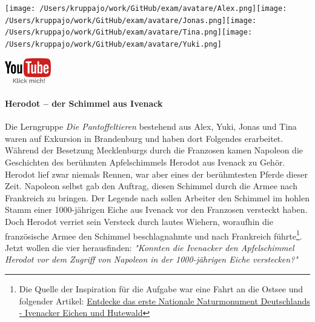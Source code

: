 \documentclass[a4paper, 9pt]{scrartcl}\usepackage[]{graphicx}\usepackage[]{xcolor}
\begin{document}
 
\ifcollection
\begin{flushright}
\tiny\vspace{-3Ex}
\textbf{\examinhaltstart}
\exammodulemathstat
\vspace{-4Ex}
\end{flushright}
\begin{minipage}[t]{0.5\textwidth}
\texttt{[image: /Users/kruppajo/work/GitHub/exam/avatare/Alex.png]}\hspace{-4mm}\texttt{[image: /Users/kruppajo/work/GitHub/exam/avatare/Jonas.png]}\hspace{-4mm}\texttt{[image: /Users/kruppajo/work/GitHub/exam/avatare/Tina.png]}\hspace{-4mm}\texttt{[image: /Users/kruppajo/work/GitHub/exam/avatare/Yuki.png]}
\end{minipage}
\begin{minipage}[t]{0.5\textwidth}
\hfill
\href{https://youtu.be/Fu8kN0Uj13Y}{\includegraphics[width = 2cm]{img/youtube}}
\end{minipage}
\fi



\ifcollection
\paragraph{Herodot – der Schimmel aus Ivenack}
\fi

Die Lerngruppe \textit{Die Pantoffeltieren} bestehend aus Alex, Yuki, Jonas und Tina waren auf Exkursion in Brandenburg und haben dort Folgendes erarbeitet. Während der Besetzung Mecklenburgs durch die Franzosen kamen Napoleon die Geschichten des berühmten Apfelschimmels Herodot aus Ivenack zu Gehör. Herodot lief zwar niemals Rennen, war aber eines der berühmtesten Pferde dieser Zeit. Napoleon selbst gab den Auftrag, diesen Schimmel durch die Armee nach Frankreich zu bringen. Der Legende nach sollen Arbeiter den Schimmel im hohlen Stamm einer 1000-jährigen Eiche aus Ivenack vor den Franzosen versteckt haben. Doch Herodot verriet sein Versteck durch lautes Wiehern, woraufhin die französische Armee den Schimmel beschlagnahmte und nach Frankreich führte\footnote{Die Quelle der Inspiration  für die Aufgabe war eine Fahrt an die Ostsee und folgender Artikel:
  \href{https://www.wald-mv.de/landingpage/ivenacker-eichen/}{Entdecke das erste Nationale Naturmonument Deutschlands - Ivenacker Eichen und Hutewald}}. Jetzt wollen die vier herausfinden: \textit{"Konnten die Ivenacker den Apfelschimmel Herodot vor dem Zugriff von Napoleon in der 1000-jährigen Eiche verstecken?"} 
\end{document}

